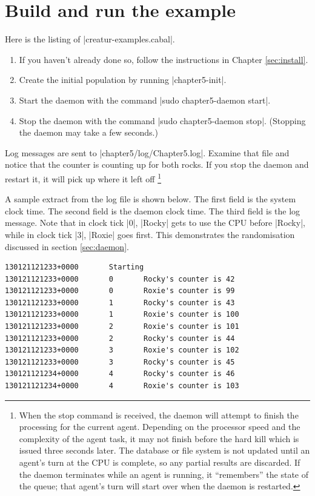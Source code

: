 \documentclass[a4paper,10pt]{report}
\begin{document}


\section{Build and run the example}
\label{sec:run1}


Here is the listing of |creatur-examples.cabal|.

\begin{enumerate}
\item If you haven't already done so, follow the instructions in Chapter
\ref{sec:install}.
\item Create the initial population by running |chapter5-init|.
\item Start the daemon with the command |sudo chapter5-daemon start|.
\item Stop the daemon with the command |sudo chapter5-daemon stop|.
(Stopping the daemon may take a few seconds.)
\end{enumerate}

Log messages are sent to |chapter5/log/Chapter5.log|.
Examine that file and notice that the counter is counting up for both rocks.
If you stop the daemon and restart it, it will pick up where it left off
\footnote{When the stop command is received, the daemon will attempt
to finish the processing for the current agent.
Depending on the processor speed and the complexity of the agent task,
it may not finish before the hard kill which is issued three seconds later.
The database or file system is not updated until an agent's turn at the CPU 
is complete, so any partial results are discarded.
If the daemon terminates while an agent is running,
it ``remembers'' the state of the queue;
that agent's turn will start over when the daemon is restarted.}

A sample extract from the log file is shown below.
The first field is the system clock time.
The second field is the daemon clock time.
The third field is the log message.
Note that in clock tick |0|, |Rocky| gets to use the CPU before |Rocky|,
while in clock tick |3|, |Roxie| goes first.
This demonstrates the randomisation discussed in section \ref{sec:daemon}.

\begin{verbatim}
130121121233+0000       Starting
130121121233+0000       0       Rocky's counter is 42
130121121233+0000       0       Roxie's counter is 99
130121121233+0000       1       Rocky's counter is 43
130121121233+0000       1       Roxie's counter is 100
130121121233+0000       2       Roxie's counter is 101
130121121233+0000       2       Rocky's counter is 44
130121121233+0000       3       Roxie's counter is 102
130121121233+0000       3       Rocky's counter is 45
130121121234+0000       4       Rocky's counter is 46
130121121234+0000       4       Roxie's counter is 103
\end{verbatim}
\end{document}
